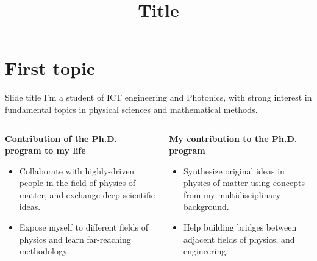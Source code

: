 \documentclass[10pt, 
               aspectratio=169,
               headline=default]{beamer} %
\title{Title}
\date{}
\begin{document}
\begin{frame}
    \maketitle
\end{frame}

\section{First topic}

\begin{frame}{Slide title}
I'm a student of ICT engineering and Photonics, with strong interest in fundamental topics in physical sciences and mathematical methods.\pause

\vspace{20pt}

\begin{columns}
	\begin{column}{.45\textwidth}
		\textbf{{\color{color_quaternary}Contribution of the Ph.D. program to my life}}
		\begin{itemize}
			\item Collaborate with highly-driven people in the field of physics of matter, and exchange deep scientific ideas.
			\item Expose myself to different fields of physics and learn far-reaching methodology.
		\end{itemize}
	\end{column}\pause

	\begin{column}{.45\textwidth}
		
		\textbf{{\color{color_quaternary}My contribution to the Ph.D. program}}
		\begin{itemize}
			\item Synthesize original ideas in physics of matter using concepts from my multidisciplinary background.
			\item Help building bridges between adjacent fields of physics, and engineering.
		\end{itemize}
            
    \end{column}
\end{columns}
\end{frame}
\end{document}
